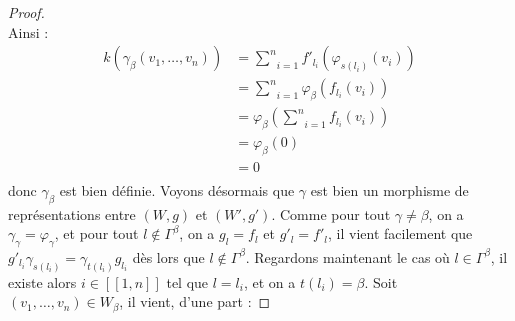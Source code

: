 \documentclass[a4paper,10pt]{article}
\begin{document}
\begin{proof}
\[	\]
Ainsi :
\[
\begin{array}{rl}
	k(\gamma_{\beta}(v_{1},\dots,v_{n})) & = \underset{i=1}{\overset{n}{\sum}}f'_{l_{i}}(\varphi_{s(l_{i})}(v_{i})) \\ 
	& = \underset{i=1}{\overset{n}{\sum}} \varphi_{\beta}(f_{l_{i}}(v_{i}))\\
	& = \varphi_{\beta}(\underset{i=1}{\overset{n}{\sum}}f_{l_{i}}(v_{i}))\\
	& = \varphi_{\beta}(0) \\
	& = 0 \\
\end{array}
\]
donc $\gamma_{\beta}$ est bien définie. Voyons désormais que $\gamma$ est bien un morphisme de représentations entre $(W,g)$ et $(W',g')$. Comme pour tout $\gamma\neq\beta$, on a $\gamma_{\gamma}=\varphi_{\gamma}$, et pour tout $l\notin\Gamma^{\beta}$, on a $g_{l}=f_{l}$ et $g'_{l}=f'_{l}$, il vient facilement que $g'_{l_{i}}\gamma_{s(l_{i})}=\gamma_{t(l_{i})}g_{l_{i}}$ dès lors que $l\notin\Gamma^{\beta}$. Regardons maintenant le cas où $l\in\Gamma^{\beta}$, il existe alors $i\in[\![1,n]\!]$ tel que $l=l_{i}$, et on a $t(l_{i})=\beta$. Soit $(v_{1},\dots,v_{n})\in W_{\beta}$, il vient, d'une part :


\end{proof}
\end{document}
